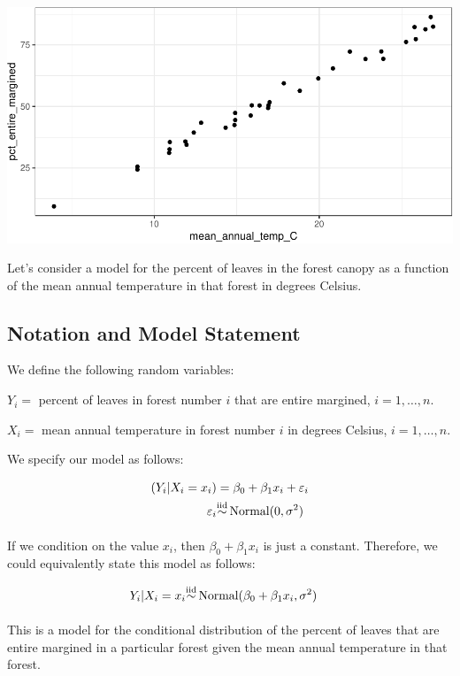 \documentclass[]{article}
\begin{document}
\includegraphics{20190213_mle_slr_solutions_files/figure-latex/unnamed-chunk-1-1.pdf}

Let's consider a model for the percent of leaves in the forest canopy as
a function of the mean annual temperature in that forest in degrees
Celsius.

\subsection{Notation and Model
Statement}\label{notation-and-model-statement}

We define the following random variables:

\(Y_i =\) percent of leaves in forest number \(i\) that are entire
margined, \(i = 1, \ldots, n\).

\(X_i =\) mean annual temperature in forest number \(i\) in degrees
Celsius, \(i = 1, \ldots, n\).

We specify our model as follows:

\begin{align*}
(Y_i | X_i = x_i) &= \beta_0 + \beta_1 x_i + \varepsilon_i \\
\varepsilon_i &{\mathrel {\mathop {\sim}\limits _{}^{\rm iid}}\,} \text{Normal}(0, \sigma^2)
\end{align*}

If we condition on the value \(x_i\), then \(\beta_0 + \beta_1 x_i\) is
just a constant. Therefore, we could equivalently state this model as
follows:

\begin{align*}
Y_i | X_i = x_i &{\mathrel {\mathop {\sim}\limits _{}^{\rm iid}}\,} \text{Normal}(\beta_0 + \beta_1 x_i, \sigma^2)
\end{align*}

This is a model for the conditional distribution of the percent of
leaves that are entire margined in a particular forest given the mean
annual temperature in that forest.
\end{document}
